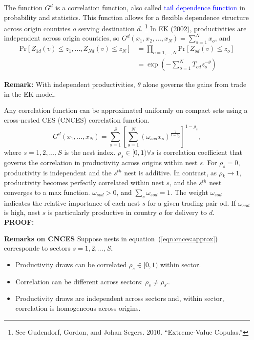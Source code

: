 The function $G^d$ is a correlation function, 
also called \textcolor{blue}{tail dependence function} 
in probability and statistics. 
This function allows for a flexible dependence structure across origin countries $o$ 
serving destination $d$.%
\footnote{
    See Gudendorf, Gordon, and Johan Segers. 2010. “Extreme-Value Copulas.”
}
In EK (2002), productivities are independent across origin countries, so 
$G^d(x_1, x_2, \ldots, x_N) = \sum_{o=1}^N x_o$,
and
\begin{equation}
    \begin{aligned}
        \text{Pr}\left[Z_{1 d}(v) \leq z_1, \ldots, Z_{N d}(v) \leq z_N\right] & 
        = \prod_{o=1,\ldots,N}  \text{Pr}\left[Z_{o d}(v) \leq z_o \right] \\
        & = \exp \left( - \sum_{o=1}^N T_{od} z_o^{-\theta} \right)
    \end{aligned}
\end{equation}

\textbf{Remark:} With independent productivities, 
$\theta$ alone governs the gains from trade in the EK model.



\begin{boxedproposition}
    Any correlation function can be approximated uniformly on compact sets using a cross-nested CES (CNCES) correlation function.
    \begin{equation}
        \label{eqn:cnces:approx}
        G^d\left(x_1, \ldots, x_N\right)=\sum_{s=1}^S\left[\sum_{o=1}^N\left(\omega_{s o d} x_o\right)^{\frac{1}{1-\rho_s}}\right]^{1-\rho_s},
    \end{equation}
where $s = 1,2,\ldots,S$ is the nest index. 
$\rho_s \in[0,1) \forall s$ is correlation coefficient that governs the correlation in productivity across origins within nest $s$. 
For $\rho_s=0$, productivity is independent and the $s^{th}$ nest is additive. 
In contrast, as $\rho_k \rightarrow 1$,
productivity becomes perfectly correlated within nest $s$, and the $s^{th}$ nest converges to a max function.
$\omega_{s o d}>0$, and $\sum_s \omega_{s o d}=1$. 
The weight $\omega_{s o d}$ indicates the relative importance of each nest $s$ for a given trading pair od. 
If $\omega_{s o d}$ is high, nest $s$ is particularly productive in country $o$ for delivery to $d$.
\\
\noindent \textbf{PROOF:}
\end{boxedproposition}

\textbf{Remarks on CNCES}
Suppose nests in equation~(\ref{eqn:cnces:approx})
corresponde to sectors $s = 1,2, \ldots, S$.
\begin{itemize}
    \item Productivity draws can be correlated $\rho_s \in[0,1)$ within sector.
    \item Correlation can be different across sectors: $\rho_s \neq \rho_{s'}$.
    \item Productivity draws are independent across sectors and, within sector, correlation is homogeneous across origins.
\end{itemize}

